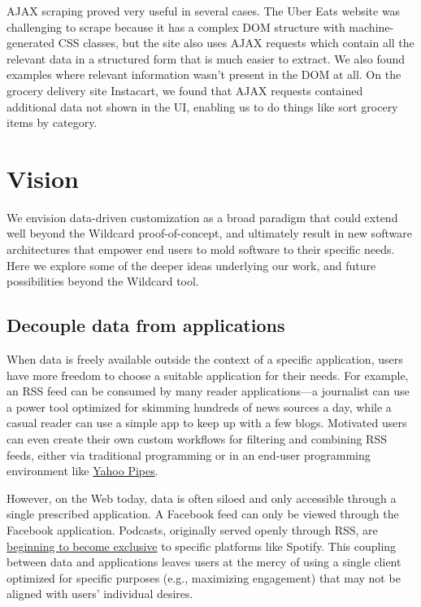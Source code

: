 \documentclass[sigplan,screen,10pt,anonymous,review]{acmart}
\begin{document}
AJAX scraping proved very useful in several cases. The Uber Eats website
was challenging to scrape because it has a complex DOM structure with
machine-generated CSS classes, but the site also uses AJAX requests
which contain all the relevant data in a structured form that is much
easier to extract. We also found examples where relevant information
wasn't present in the DOM at all. On the grocery delivery site
Instacart, we found that AJAX requests contained additional data not
shown in the UI, enabling us to do things like sort grocery items by
category.

\hypertarget{sec:visions}{%
\section{Vision}\label{sec:visions}}

We envision data-driven customization as a broad paradigm that could
extend well beyond the Wildcard proof-of-concept, and ultimately result
in new software architectures that empower end users to mold software to
their specific needs. Here we explore some of the deeper ideas
underlying our work, and future possibilities beyond the Wildcard tool.

\hypertarget{decouple-data-from-applications}{%
\subsection{Decouple data from
applications}\label{decouple-data-from-applications}}

When data is freely available outside the context of a specific
application, users have more freedom to choose a suitable application
for their needs. For example, an RSS feed can be consumed by many reader
applications---a journalist can use a power tool optimized for skimming
hundreds of news sources a day, while a casual reader can use a simple
app to keep up with a few blogs. Motivated users can even create their
own custom workflows for filtering and combining RSS feeds, either via
traditional programming or in an end-user programming environment like
\href{https://en.wikipedia.org/wiki/Yahoo!_Pipes}{Yahoo Pipes}.

However, on the Web today, data is often siloed and only accessible
through a single prescribed application. A Facebook feed can only be
viewed through the Facebook application. Podcasts, originally served
openly through RSS, are
\href{https://stratechery.com/2019/spotifys-podcast-aggregation-play/}{beginning
to become exclusive} to specific platforms like Spotify. This coupling
between data and applications leaves users at the mercy of using a
single client optimized for specific purposes (e.g., maximizing
engagement) that may not be aligned with users' individual desires.
\end{document}
